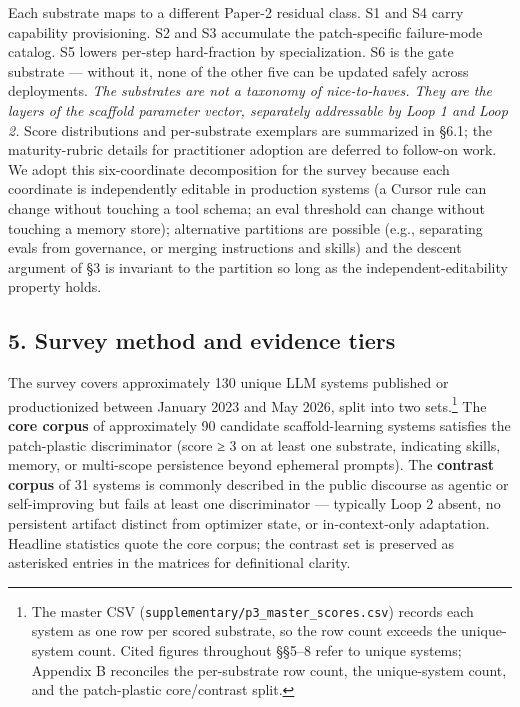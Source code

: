 \documentclass[
]{article}
\newcounter{none} %
\begin{document}
Each substrate maps to a different Paper-2 residual class. S1 and S4
carry capability provisioning. S2 and S3 accumulate the patch-specific
failure-mode catalog. S5 lowers per-step hard-fraction by
specialization. S6 is the gate substrate --- without it, none of the
other five can be updated safely across deployments. \emph{The
substrates are not a taxonomy of nice-to-haves. They are the layers of
the scaffold parameter vector, separately addressable by Loop 1 and Loop
2.} Score distributions and per-substrate exemplars are summarized in
§6.1; the maturity-rubric details for practitioner adoption are deferred
to follow-on work. We adopt this six-coordinate decomposition for the
survey because each coordinate is independently editable in production
systems (a Cursor rule can change without touching a tool schema; an
eval threshold can change without touching a memory store); alternative
partitions are possible (e.g., separating evals from governance, or
merging instructions and skills) and the descent argument of §3 is
invariant to the partition so long as the independent-editability
property holds.

\subsection{5. Survey method and evidence
tiers}\label{survey-method-and-evidence-tiers}

The survey covers approximately 130 unique LLM systems published or
productionized between January 2023 and May 2026, split into two
sets.\footnote{The master CSV
  (\texttt{supplementary/p3\_master\_scores.csv}) records each system as
  one row per scored substrate, so the row count exceeds the
  unique-system count. Cited figures throughout §§5--8 refer to unique
  systems; Appendix B reconciles the per-substrate row count, the
  unique-system count, and the patch-plastic core/contrast split.} The
\textbf{core corpus} of approximately 90 candidate scaffold-learning
systems satisfies the patch-plastic discriminator (score ≥ 3 on at least
one substrate, indicating skills, memory, or multi-scope persistence
beyond ephemeral prompts). The \textbf{contrast corpus} of 31 systems is
commonly described in the public discourse as agentic or self-improving
but fails at least one discriminator --- typically Loop 2 absent, no
persistent artifact distinct from optimizer state, or in-context-only
adaptation. Headline statistics quote the core corpus; the contrast set
is preserved as asterisked entries in the matrices for definitional
clarity.
\end{document}
